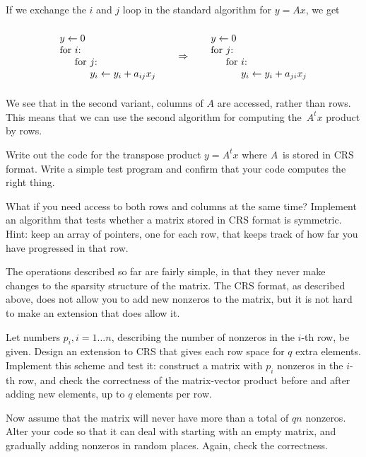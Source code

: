 If we exchange the $i$ and $j$ loop in the standard algorithm for
$y=Ax$, we get
\[
  \vcenter{
    \begin{tabbing}
      $y\leftarrow 0$\\
      for \=$i$:\\
      \> for \=$j$:\\
      \>\> $y_i\leftarrow y_i+a_{ij}x_j$
    \end{tabbing}
  }\qquad\Rightarrow\qquad
  \vcenter{
    \begin{tabbing}
      $y\leftarrow 0$\\
      for \=$j$:\\
      \> for \=$i$:\\
      \>\> $y_i\leftarrow y_i+a_{ji}x_j$
    \end{tabbing}
  }
\]
We see that in the second variant, columns of $A$ are accessed, rather
than rows. This means that we can use the second algorithm for
computing the~$A^tx$ product by rows.

\begin{exercise}
  Write out the code for the transpose product $y=A^tx$ where $A$~is
  stored in \ac{CRS} format. Write a simple test program and confirm
  that your code computes the right thing.
\end{exercise}

\begin{exercise}
  What if you need access to both rows and columns at the same time?
  Implement an algorithm that tests whether a matrix stored in CRS
  format is symmetric. Hint: keep an array of pointers, one for each
  row, that keeps track of how far you have progressed in that row.
\end{exercise}

\begin{exercise}
The operations described so far are fairly simple, in that they never
make changes to the sparsity structure of the matrix. The CRS format,
as described above, does not allow you to add new nonzeros to the
matrix, but it is not hard to make an extension that does allow it.

Let numbers $p_i, i=1\ldots n$, describing the number of nonzeros in
the $i$-th row, be given.  Design an extension to CRS that gives each
row space for $q$ extra elements. Implement this scheme and test it:
construct a matrix with $p_i$ nonzeros in the $i$-th row, and check
the correctness of the matrix-vector product before and after adding
new elements, up to $q$ elements per row.

Now assume that the matrix will never have more than a total of $qn$
nonzeros. Alter your code so that it can deal with starting with an
empty matrix, and gradually adding nonzeros in random places. Again,
check the correctness.
\end{exercise}

